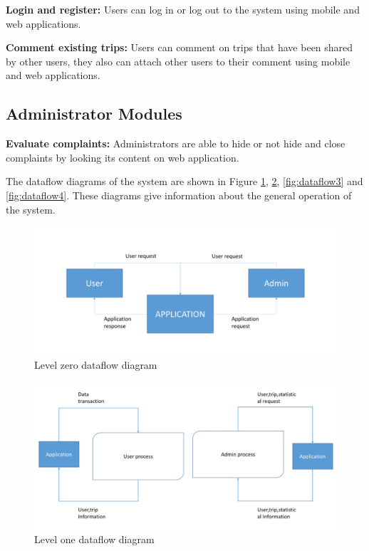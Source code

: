\textbf{Login and register:} Users can log in or log out to the system using mobile and web applications.

\textbf{Comment existing trips:} Users can comment on trips that have been shared by other users, they also can attach other users to their comment using mobile and web applications.

\subsection{Administrator Modules}
\textbf{Evaluate complaints:} Administrators are able to hide or not hide and close complaints by looking its content on web application.

\newpage
The dataflow diagrams of the system are shown in Figure \ref{fig:dataflow}, \ref{fig:dataflow2}, \ref{fig:dataflow3} and \ref{fig:dataflow4}.
\newline
These diagrams give information about the general operation of the system.
\begin{figure}[!ht]
\centering
\includegraphics[scale=0.6]{projectChapters/images/dataflow.png}
\caption{Level zero dataflow diagram }
\label{fig:dataflow}
\end{figure}

\begin{figure}[!ht]
\centering
\includegraphics[scale=0.6]{projectChapters/images/dataflow2.png}
\caption{Level one dataflow diagram}
\label{fig:dataflow2}
\end{figure}

